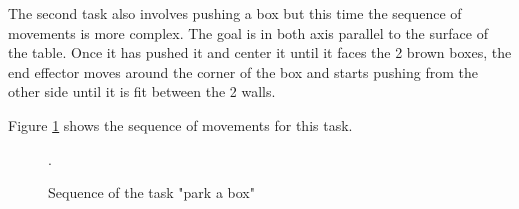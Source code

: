 The second task also involves pushing a box but this time the sequence of movements is more complex. The goal is in both axis parallel to the surface of the table. Once it has pushed it and center it until it faces the 2 brown boxes, the end effector moves around the corner of the box and starts pushing from the other side until it is fit between the 2 walls. 

Figure \ref{fig:park-box} shows the sequence of movements for this task.


 \begin{figure}[H]
  \centering
   \hfill
   \hfill
   \hfill
   \hfill
   \hfill
  \caption{Sequence of the task "park a box"}.
  \label{fig:park-box}
\end{figure}


